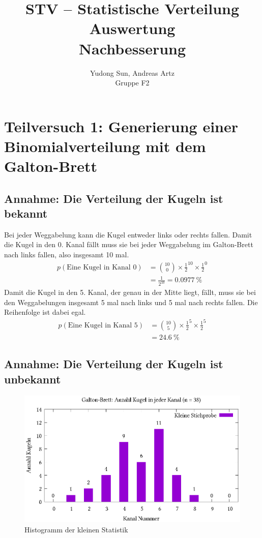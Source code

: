 \documentclass[twoside]{article}
\title{STV -- Statistische Verteilung \\ Auswertung \\Nachbesserung}
\author{Yudong Sun, Andreas Artz \\ Gruppe F2}
\begin{document}
\maketitle

\section*{Teilversuch 1: Generierung einer Binomialverteilung mit dem Galton-Brett}

    \subsection*{Annahme: Die Verteilung der Kugeln ist bekannt}
        Bei jeder Weggabelung kann die Kugel entweder links oder rechts fallen. Damit die Kugel in den 0. Kanal fällt muss sie bei jeder Weggabelung im Galton-Brett nach links fallen, also insgesamt 10 mal. 
        \begin{align*}
            p(\text{Eine Kugel in Kanal 0}) &=\binom{10}{0} \times \frac{1}{2}^{10} \times \frac{1}{2}^0 \\
            &= \frac{1}{2^{10}} = \SI{0.0977}{}\% 
        \end{align*}
        Damit die Kugel in den 5. Kanal, der genau in der Mitte liegt, fällt, muss sie bei den Weggabelungen insgesamt 5 mal nach links und 5 mal nach rechts fallen. Die Reihenfolge ist dabei egal.
        \begin{align*}
            p(\text{Eine Kugel in Kanal 5}) &=\binom{10}{5} \times \frac{1}{2}^{5} \times \frac{1}{2}^{5} \\
            &= \SI{24.6}{}\% 
        \end{align*}
        
    \pagebreak
    \subsection*{Annahme: Die Verteilung der Kugeln ist unbekannt}
    
        \begin{figure}[!ht]
            \centering
            \includegraphics{kleine.eps}
            \caption{Histogramm der kleinen Statistik}
            \label{fig:kleine_histo}
        \end{figure}
        
\end{document}

